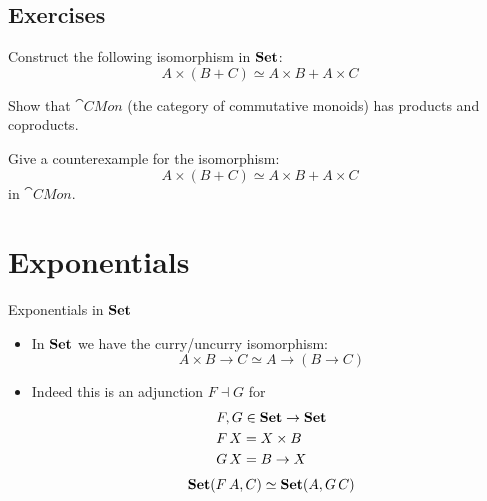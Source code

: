 \documentclass[handout]{beamer}
\begin{document}
\subsection{Exercises}

\begin{frame}
  
  \begin{exercise}
    Construct the following isomorphism in $\mathbf{Set}$:
    \[ A \times (B + C) \simeq A\times B + A \times C \]
  \end{exercise}

  \begin{exercise}
    Show that $\cat{CMon}$ (the category of commutative monoids) has products and coproducts.
  \end{exercise}

  \begin{exercise}
    Give a counterexample for the isomorphism:
    \[ A \times (B + C) \simeq A\times B + A \times C \]
    in $\cat{CMon}$.
  \end{exercise}

\end{frame}

\section{Exponentials}

\begin{frame}{Exponentials in $\mathbf{Set}$}
  
  \begin{itemize}
  \item In $\mathbf{Set}$ we have the curry/uncurry isomorphism:
    \[ A \times B \to C \simeq A \to (B \to C) \]

  \item Indeed this is an adjunction $F \dashv G$ for
    \begin{align*}
      & F,G \in \mathbf{Set} \to \mathbf{Set} \\
      & F\,X = X \times B \\
      & G\,X = B \to X
    \end{align*}
    \[ \mathbf{Set}(F\,A,C) \simeq \mathbf{Set}(A,G\,C)\]
  \end{itemize}

\end{frame}
\end{document}
